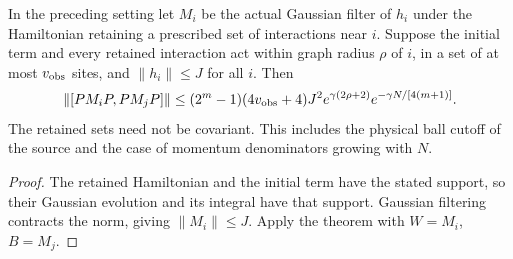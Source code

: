 \begin{lemma}
    \label{cor:hastings_finite_translation_truncated}
    \leanok
    In the preceding setting let $M_i$ be the actual Gaussian filter
    of $h_i$ under the Hamiltonian retaining a prescribed set of
    interactions near $i$. Suppose the initial term and every retained
    interaction act within graph radius $\rho$ of $i$, in a set of
    at most $v_{\rm obs}$ sites, and $\|h_i\|\le J$ for all $i$.
    Then
    \[
        \|[PM_iP,PM_jP]\|
        \le (2^m-1)(4v_{\rm obs}+4)J^2
        e^{\gamma(2\rho+2)}e^{-\gamma N/[4(m+1)]}.
    \]
    The retained sets need not be covariant. This includes the
    physical ball cutoff of the source and the case of momentum
    denominators growing with $N$.
\end{lemma}
\begin{proof}\leanok
    The retained Hamiltonian and the initial term have the stated
    support, so their Gaussian evolution and its integral have that
    support. Gaussian filtering contracts the norm, giving
    $\|M_i\|\le J$. Apply the theorem with $W=M_i$, $B=M_j$.
\end{proof}
